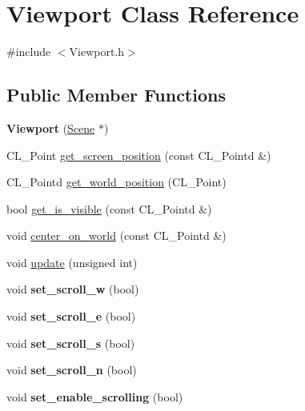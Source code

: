 \hypertarget{classViewport}{
\section{Viewport Class Reference}
\label{classViewport}
}


{\ttfamily \#include $<$Viewport.h$>$}

\subsection*{Public Member Functions}
\begin{DoxyCompactItemize}
\item 
\hypertarget{classViewport_aaca5213263cd1d9396133e2e50a8912e}{
{\bfseries Viewport} (\hyperlink{classScene}{Scene} $\ast$)}
\label{classViewport_aaca5213263cd1d9396133e2e50a8912e}

\item 
CL\_\-Point \hyperlink{classViewport_a6fa5e4483a38e8775252bfa1467cdc77}{get\_\-screen\_\-position} (const CL\_\-Pointd \&)
\item 
CL\_\-Pointd \hyperlink{classViewport_ab6c214c3791a3314711e933e831d6ed0}{get\_\-world\_\-position} (CL\_\-Point)
\item 
bool \hyperlink{classViewport_a4a80ef891f5678d6debdaa8a988a5bd0}{get\_\-is\_\-visible} (const CL\_\-Pointd \&)
\item 
void \hyperlink{classViewport_acacc14d6b2ca0f48734b0ae392938886}{center\_\-on\_\-world} (const CL\_\-Pointd \&)
\item 
void \hyperlink{classViewport_ad6b4c3ce84e139598414bb61c4802e17}{update} (unsigned int)
\item 
\hypertarget{classViewport_a3ecf4cc556e2f263f6096735ba49deef}{
void {\bfseries set\_\-scroll\_\-w} (bool)}
\label{classViewport_a3ecf4cc556e2f263f6096735ba49deef}

\item 
\hypertarget{classViewport_a2ed43f02a30e2e27e671c7c80a60330b}{
void {\bfseries set\_\-scroll\_\-e} (bool)}
\label{classViewport_a2ed43f02a30e2e27e671c7c80a60330b}

\item 
\hypertarget{classViewport_a7dce4c5f2fa304c0faa661bfc8437cce}{
void {\bfseries set\_\-scroll\_\-s} (bool)}
\label{classViewport_a7dce4c5f2fa304c0faa661bfc8437cce}

\item 
\hypertarget{classViewport_a7fd5cd6fc729ac2c42106d073775d089}{
void {\bfseries set\_\-scroll\_\-n} (bool)}
\label{classViewport_a7fd5cd6fc729ac2c42106d073775d089}

\item 
\hypertarget{classViewport_a635a0926d12b7ea83c9f46731c401ba8}{
void {\bfseries set\_\-enable\_\-scrolling} (bool)}
\label{classViewport_a635a0926d12b7ea83c9f46731c401ba8}

\end{DoxyCompactItemize}
